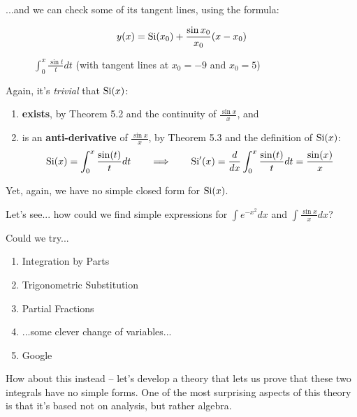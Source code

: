 ...and we can check some of its tangent lines, using the formula:

$$ y(x) = {\rm Si}(x_0) + \frac{\sin x_0}{x_0}(x-x_0)$$

\begin{figure}[H]
\begin{center}
\begin{comment}
\begin{maximacode}
line(x,x0,l) := if abs(x-x0) < l then Si(x0) + sinc(x0)*(x-x0) else %
pdfplot2d ([Si(x), 'line(x,-9,3), 'line(x,5,3)],
           [x, -20, 20], [y, -2, 2], [ylabel, false], [grid2d, true], [legend, false],
           [color, red, blue, blue], [xtics, 20], [ytics, 2])$
\end{maximacode}
\end{comment}
\end{center}
\caption{$\int_0^x \frac{\sin t}{t} dt$ (with tangent lines at $x_0=-9$ and $x_0=5$)}
\end{figure}

Again, it's {\it trivial} that ${\rm Si}(x)$:

\begin{enumerate}
\item {\bf exists}, by \cite{briggs} Theorem 5.2 and the continuity of $\frac{\sin x}{x}$, and
\item is an {\bf anti-derivative} of $\frac{\sin x}{x}$, by \cite{briggs} Theorem 5.3 and the definition of ${\rm Si}(x)$:
$${\rm Si}(x) = \int_0^x \frac{\sin(t)}{t} dt \qquad\Longrightarrow\qquad {\rm Si}'(x) = \frac{d}{dx}\int_0^x \frac{\sin(t)}{t} dt = \frac{\sin(x)}{x}$$
\end{enumerate}

Yet, again, we have no simple closed form for ${\rm Si}(x)$.

Let's see... how could we find simple expressions for $\int e^{-x^2} dx$ and $\int \frac{\sin x}{x} dx$?

Could we try...

\begin{enumerate}
\item Integration by Parts
\item Trigonometric Substitution
\item Partial Fractions
\item ...some clever change of variables...
\item Google
\end{enumerate}

How about this instead -- let's develop a theory that lets us
prove that these two integrals have no simple forms.  One
of the most surprising aspects of this theory is that
it's based not on analysis, but rather algebra.


